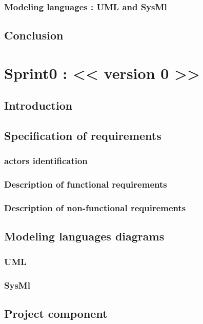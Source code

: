 \documentclass{report}
\begin{document}
\subsection{Modeling languages : UML and SysMl}
\vspace{1em}
\section*{Conclusion}

\chapter{Sprint0 :  <{}< version 0 >{}>}
\section*{Introduction}
\section{Specification of requirements}
\subsection{actors identification }
\subsection{Description of functional requirements}
\subsection{Description of non-functional requirements}
\vspace{1em}

\section{Modeling languages diagrams}
\subsection{UML}
\subsection{SysMl}
\vspace{1em}


\section{Project component}
\end{document}
